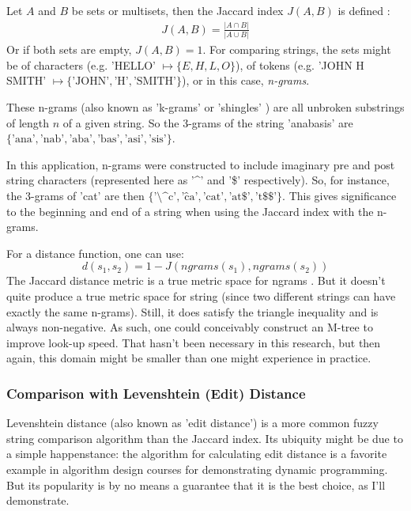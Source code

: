 \documentclass[11pt]{article}
\begin{document}
Let $A$ and $B$ be sets or multisets, then the Jaccard index $J(A,B)$ is defined \cite{mining, comparison}:
\begin{align*}
    J(A, B) = \frac{\left| A \cap B \right|}{\left| A \cup B \right|}
\end{align*}
Or if both sets are empty, $J(A,B) = 1$.
For comparing strings, the sets might be of characters (e.g. 'HELLO' $\mapsto \{E, H, L, O\}$), 
of tokens (e.g. 'JOHN H SMITH' $\mapsto \{\text{'JOHN'}, \text{'H'}, \text{'SMITH'}\}$),
or in this case, {\em n-grams}.

These n-grams (also known as 'k-grams' or 'shingles' \cite{mining}) are all unbroken substrings of 
length $n$ of a given string. So the 3-grams of the string 'anabasis' are 
$\{\text{'ana'}, \text{'nab'}, \text{'aba'}, \text{'bas'}, \text{'asi'}, \text{'sis'}\}$. 

In this application, n-grams were constructed to include imaginary pre and post string characters
(represented here as '\^{}' and '\$' respectively). So, for instance, the 3-grams of 'cat' are then
$\{\text{'\^{}\^{}c'}, \text{'\^{}ca'}, \text{'cat'}, \text{'at\$'}, \text{'t\$\$'}\}$. This gives
significance to the beginning and end of a string when using the Jaccard index with the n-grams.

For a distance function, one can use:
\[d(s_1,s_2) = 1-J(ngrams(s_1),ngrams(s_2))\]
The Jaccard distance metric is a true metric space for ngrams \cite{data_mining}.
But it doesn't quite produce a true metric space for string
(since two different strings can have exactly the same n-grams). Still, it does satisfy
the triangle inequality \cite{general} and is always non-negative. As such, one could
conceivably construct an M-tree \cite{mtree} to improve look-up speed. 
That hasn't been necessary in this research, but then again, this domain might be smaller
than one might experience in practice.

\subsubsection{Comparison with Levenshtein (Edit) Distance}
Levenshtein distance (also known as 'edit distance') is a more common fuzzy string comparison algorithm
than the Jaccard index. 
Its ubiquity might be due to a simple happenstance: the algorithm for calculating edit distance is
a favorite example in algorithm design courses for demonstrating dynamic programming.
But its popularity is by no means a guarantee that it is the best choice, as I'll demonstrate.
\end{document}
